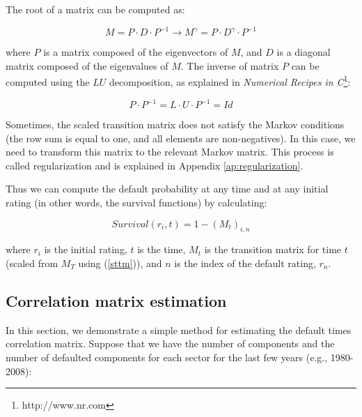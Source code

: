\documentclass[a4paper,12pt,final]{article}
\begin{document}
The root of a matrix can be computed as:

\begin{displaymath}
M = P \cdot D \cdot P^{-1}
\longrightarrow
M^{\gamma} = P \cdot D^{\gamma} \cdot P^{-1}
\end{displaymath}

where $P$ is a matrix composed of the eigenvectors of $M$, and $D$ is a diagonal 
matrix composed of the eigenvalues of $M$. The inverse of matrix $P$ can be 
computed using the $LU$ decomposition, as explained in \emph{Numerical 
Recipes in C}\footnote{http://www.nr.com}:

\begin{displaymath}
P \cdot P^{-1} = L \cdot U \cdot P^{-1} = Id
\end{displaymath}

Sometimes, the scaled transition matrix does not satisfy the Markov conditions
(the row sum is equal to one, and all elements are non-negatives). In this case, 
we need to transform this matrix to the relevant Markov matrix. This process is 
called regularization and is explained in Appendix \ref{ap:regularization}.
\newline

Thus we can compute the default probability at any time and at any initial 
rating (in other words, the survival functions) by calculating:

\begin{displaymath}
Survival(r_i, t) = 1 - \left( M_t \right)_{i, n}
\end{displaymath}

where $r_i$ is the initial rating, $t$ is the time, $M_t$ is the transition 
matrix for time $t$ (scaled from $M_T$ using (\ref{sttm})), and $n$ is the 
index of the default rating, $r_n$.

\subsection{Correlation matrix estimation}
\label{ap:mcorrel}

In this section, we demonstrate a simple method for estimating the default times 
correlation matrix. Suppose that we have the number of components and the 
number of defaulted components for each sector for the last few years (e.g., 
1980-2008):
\end{document}
